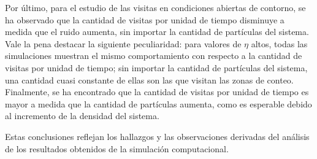 \documentclass[11pt, a4paper]{article}
\begin{document}
        Por último, para el estudio de las visitas en condiciones abiertas de contorno, se ha observado que la cantidad
        de visitas por unidad de tiempo disminuye a medida que el ruido aumenta, sin importar la cantidad de
        partículas del sistema.
        Vale la pena destacar la siguiente peculiaridad: para valores de $\eta$ altos, todas las simulaciones muestran
        el mismo comportamiento con respecto a la cantidad de visitas por unidad de tiempo; sin importar la cantidad de
        partículas del sistema, una cantidad cuasi constante de ellas son las que visitan las zonas de conteo.
        Finalmente, se ha encontrado que la cantidad de visitas por unidad de tiempo es mayor a medida que la cantidad de partículas
        aumenta, como es esperable debido al incremento de la densidad del sistema.

        Estas conclusiones reflejan los hallazgos y las observaciones derivadas del análisis de los resultados
        obtenidos de la simulación computacional.
\end{document}
